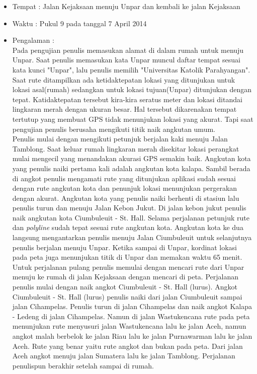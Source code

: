 		\begin{itemize}
			\item Tempat : Jalan Kejaksaan menuju Unpar dan kembali ke jalan Kejaksaan
			\item Waktu : Pukul 9 pada tanggal 7 April 2014 
			\item Pengalaman : \\
			\hspace{0.5cm} Pada pengujian penulis memasukan alamat di dalam rumah untuk menuju Unpar. Saat penulis memasukan kata Unpar muncul daftar tempat sesuai kata kunci "Unpar", lalu penulis memilih "Universitas Katolik Parahyangan". Saat rute ditampilkan ada ketidaktepatan lokasi yang ditunjukan untuk lokasi asal(rumah) sedangkan untuk lokasi tujuan(Unpar) ditunjukan dengan tepat. Katidaktepatan tersebut kira-kira seratus meter dan lokasi ditandai lingkaran merah dengan ukuran besar. Hal tersebut dikarenakan tempat tertutup yang membuat GPS tidak menunjukan lokasi yang akurat. Tapi saat pengujian penulis berusaha mengikuti titik naik angkutan umum.\\
			
			\hspace{0.5cm}Penulis mulai dengan mengikuti petunjuk berjalan kaki menuju Jalan Tamblong. Saat keluar rumah lingkaran merah disekitar lokasi perangkat mulai mengecil yang menandakan akurasi GPS semakin baik. Angkutan kota yang penulis naiki pertama kali adalah angkutan kota kalapa. Sambil berada di angkot penulis mengamati rute yang ditunjukan aplikasi sudah sesuai dengan rute angkutan kota dan penunjuk lokasi menunjukan pergerakan dengan akurat. Angkutan kota yang penulis naiki berhenti di stasiun lalu penulis turun dan menuju Jalan Kebon Jukut. Di jalan kebon jukut penulis naik angkutan kota Ciumbuleuit - St. Hall. Selama perjalanan petunjuk rute dan \textit{polyline} sudah tepat sesuai rute angkutan kota. Angkutan kota ke dua langsung mengantarkan penulis menuju Jalan Ciumbuleuit untuk selanjutnya penulis berjalan menuju Unpar. Ketika sampai di Unpar, kordinat lokasi pada peta juga menunjukan titik di Unpar dan memakan waktu 65 menit.\\
			
			\hspace{0.5cm}Untuk perjalanan pulang penulis memulai dengan mencari rute dari Unpar menuju ke rumah di jalan Kejaksaan dengan mencari di peta. Perjalanan penulis mulai dengan naik angkot Ciumbuleuit - St. Hall (lurus). Angkot Ciumbuleuit - St. Hall (lurus) penulis naiki dari jalan Ciumbuleuit sampai jalan Cihampelas. Penulis turun di jalan Cihampelas dan naik angkot Kalapa - Ledeng di jalan Cihampelas. Namun di jalan Wastukencana rute pada peta menunjukan rute menyusuri jalan Wastukencana lalu ke jalan Aceh, namun angkot malah berbelok ke jalan Riau lalu ke jalan Purnawarman lalu ke jalan Aceh. Rute yang benar yaitu rute angkot dan bukan pada peta. Dari jalan Aceh angkot menuju jalan Sumatera lalu ke jalan Tamblong. Perjalanan penulispun berakhir setelah sampai di rumah.
		\end{itemize}

